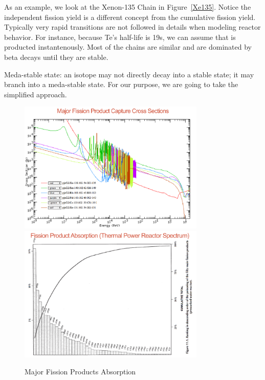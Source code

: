 \documentclass{school-22.211-notes}
\begin{document}
As an example, we look at the Xenon-135 Chain in Figure~\ref{Xe135}. Notice the independent fission yield is a different concept from the cumulative fission yield. Typically very rapid transitions are not followed in details when modeling reactor behavior. For instance, because Te's half-life is 19s, we can assume that  is producted instantenously. Most of the chains are similar and are dominated by beta decays until they are stable. 

Meda-stable state: an isotope may not directly decay into a stable state; it may branch into a meda-stable state. For our purpose, we are going to take the simplified approach.

\begin{figure}
  \centering
  \includegraphics[width=3.5in]{images/dfs/fission-product-capture-xs.png}
  \includegraphics[width=3.5in]{images/dfs/fission-product-absorption.png}
  \caption{Major Fission Products Absorption} \label{major-capture} 
\end{figure}
\end{document}
